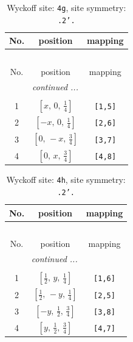 \documentclass[fleqn,8pt]{jsarticle}
\begin{document}
\begin{longtable}{ccc}
\caption{Wyckoff site: {\tt 4g}, site symmetry: {\tt .2'.}}
 \\
 \hline \hline
No. & position & mapping \\ \hline \endfirsthead

\multicolumn{2}{l}{\tablename\ \thetable{}} \\
 \hline \hline
No. & position & mapping \\ \hline \endhead

 \hline \hline
\multicolumn{2}{r}{\footnotesize\it continued ...} \\ \endfoot

 \hline \hline
\multicolumn{2}{r}{} \\ \endlastfoot

1 & $\left[ x,\, 0,\, \frac{1}{4} \right]$ & {\tt [1,5]} \\ \hline
2 & $\left[ - x,\, 0,\, \frac{1}{4} \right]$ & {\tt [2,6]} \\ \hline
3 & $\left[ 0,\, - x,\, \frac{3}{4} \right]$ & {\tt [3,7]} \\ \hline
4 & $\left[ 0,\, x,\, \frac{3}{4} \right]$ & {\tt [4,8]} \\
\end{longtable}
\renewcommand{\arraystretch}{1.2}
\begin{longtable}{ccc}
\caption{Wyckoff site: {\tt 4h}, site symmetry: {\tt .2'.}}
 \\
 \hline \hline
No. & position & mapping \\ \hline \endfirsthead

\multicolumn{2}{l}{\tablename\ \thetable{}} \\
 \hline \hline
No. & position & mapping \\ \hline \endhead

 \hline \hline
\multicolumn{2}{r}{\footnotesize\it continued ...} \\ \endfoot

 \hline \hline
\multicolumn{2}{r}{} \\ \endlastfoot

1 & $\left[ \frac{1}{2},\, y,\, \frac{1}{4} \right]$ & {\tt [1,6]} \\ \hline
2 & $\left[ \frac{1}{2},\, - y,\, \frac{1}{4} \right]$ & {\tt [2,5]} \\ \hline
3 & $\left[ - y,\, \frac{1}{2},\, \frac{3}{4} \right]$ & {\tt [3,8]} \\ \hline
4 & $\left[ y,\, \frac{1}{2},\, \frac{3}{4} \right]$ & {\tt [4,7]} \\
\end{longtable}
\end{document}
